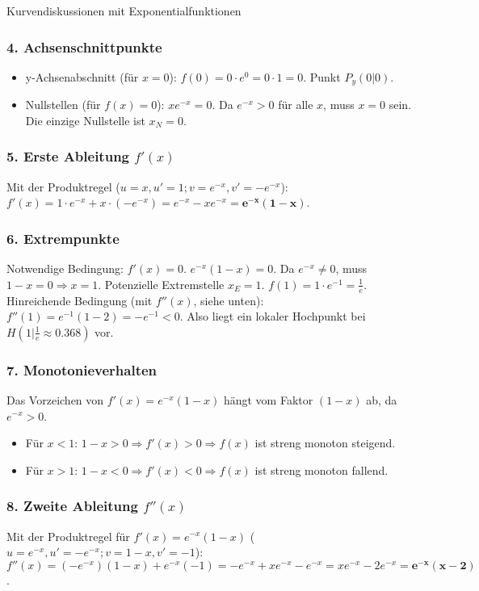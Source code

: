 \begin{loesungsumgebung}{Kurvendiskussionen mit Exponentialfunktionen}
\begin{enumerate}[label=(\alph*)]
    \subsubsection*{4. Achsenschnittpunkte}
    \begin{itemize}
        \item y-Achsenabschnitt (für $x=0$): $f(0) = 0 \cdot e^0 = 0 \cdot 1 = 0$. Punkt $P_y(0|0)$.
        \item Nullstellen (für $f(x)=0$): $xe^{-x} = 0$. Da $e^{-x} > 0$ für alle $x$, muss $x=0$ sein.
        Die einzige Nullstelle ist $x_N=0$.
    \end{itemize}

    \subsubsection*{5. Erste Ableitung $f'(x)$}
    Mit der Produktregel ($u=x, u'=1; v=e^{-x}, v'=-e^{-x}$):
    $f'(x) = 1 \cdot e^{-x} + x \cdot (-e^{-x}) = e^{-x} - xe^{-x} = \mathbf{e^{-x}(1-x)}$.

    \subsubsection*{6. Extrempunkte}
    Notwendige Bedingung: $f'(x)=0$.
    $e^{-x}(1-x) = 0$. Da $e^{-x} \neq 0$, muss $1-x=0 \Rightarrow x=1$.
    Potenzielle Extremstelle $x_E=1$. $f(1) = 1 \cdot e^{-1} = \frac{1}{e}$.
    Hinreichende Bedingung (mit $f''(x)$, siehe unten): $f''(1) = e^{-1}(1-2) = -e^{-1} < 0$.
    Also liegt ein lokaler Hochpunkt bei $H(1 | \frac{1}{e} \approx 0.368)$ vor.

    \subsubsection*{7. Monotonieverhalten}
    Das Vorzeichen von $f'(x) = e^{-x}(1-x)$ hängt vom Faktor $(1-x)$ ab, da $e^{-x}>0$.
    \begin{itemize}
        \item Für $x < 1$: $1-x > 0 \Rightarrow f'(x) > 0 \Rightarrow f(x)$ ist streng monoton steigend.
        \item Für $x > 1$: $1-x < 0 \Rightarrow f'(x) < 0 \Rightarrow f(x)$ ist streng monoton fallend.
    \end{itemize}

    \subsubsection*{8. Zweite Ableitung $f''(x)$}
    Mit der Produktregel für $f'(x)=e^{-x}(1-x)$ ($u=e^{-x}, u'=-e^{-x}; v=1-x, v'=-1$):
    $f''(x) = (-e^{-x})(1-x) + e^{-x}(-1) = -e^{-x} + xe^{-x} - e^{-x} = xe^{-x} - 2e^{-x} = \mathbf{e^{-x}(x-2)}$.


\end{enumerate}
\end{loesungsumgebung}

